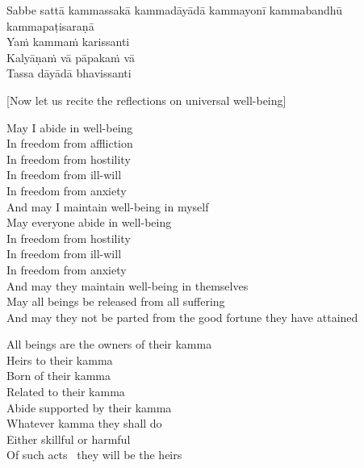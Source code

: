 Sabbe sattā kammassakā kammadāyādā kammayonī kammabandhū kammapaṭisaraṇā\\
Yaṁ kammaṁ karissanti\\
Kalyāṇaṁ vā pāpakaṁ vā\\
Tassa dāyādā bhavissanti

\begin{center}
  [Now let us recite the reflections on universal well-being]
\end{center}

\begin{english}
  May I abide in well-being\\
  In freedom from affliction\\
  In freedom from hostility\\
  In freedom from ill-will\\
  In freedom from anxiety\\
  And may I maintain well-being in myself\\
  May everyone abide in well-being\\
  In freedom from hostility\\
  In freedom from ill-will\\
  In freedom from anxiety\\
  And may they maintain well-being in themselves\\
  May all beings be released from all suffering\\
  And may they not be parted from the good fortune they have attained

  All beings are the owners of their kamma\\
  Heirs to their kamma\\
  Born of their kamma\\
  Related to their kamma\\
  Abide supported by their kamma\\
  Whatever kamma they shall do\\
  Either skillful or harmful\\
  Of such acts \breathmark\ they will be the heirs\\
\end{english}

